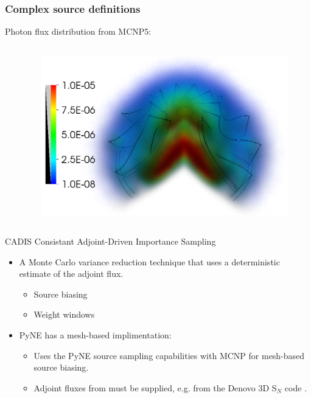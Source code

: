 \documentclass[xcolor=x11names,compress]{beamer}
\begin{document}
\begin{frame}
\frametitle{Complex source definitions}
Photon flux distribution from MCNP5:
\begin{columns}[c]

\centering
\begin{column}{0.1\textwidth}
\end{column}

\begin{column}{0.8\textwidth}
\hspace{-0.85cm}
\centerline{\includegraphics[height=7cm]{turbine_flux.png}}
\end{column}
\end{columns}

\end{frame}

\begin{frame}{CADIS}
Consistant Adjoint-Driven Importance Sampling \cite{haghighat_monte_2003}
    \begin{itemize}
        \item{A Monte Carlo variance reduction technique that uses a deterministic estimate of the adjoint flux.}
        \begin{itemize}
            \item{Source biasing}
            \item{Weight windows}
        \end{itemize}
        \item{PyNE has a mesh-based implimentation:}
        \begin{itemize}
            \item{Uses the PyNE source sampling capabilities with MCNP for mesh-based source biasing.}
            \item{Adjoint fluxes from must be supplied, e.g. from the Denovo 3D S$_N$ code \cite{Evans2010}.}
        \end{itemize}    
    \end{itemize}
\end{frame}
\end{document}
